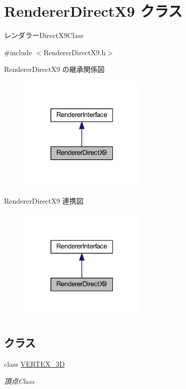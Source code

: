 \hypertarget{class_renderer_direct_x9}{}\section{Renderer\+Direct\+X9 クラス}
\label{class_renderer_direct_x9}


レンダラー\+Direct\+X9\+Class  




{\ttfamily \#include $<$Renderer\+Direct\+X9.\+h$>$}



Renderer\+Direct\+X9 の継承関係図
\nopagebreak
\begin{figure}[H]
\begin{center}
\leavevmode
\includegraphics[width=172pt]{class_renderer_direct_x9__inherit__graph}
\end{center}
\end{figure}


Renderer\+Direct\+X9 連携図
\nopagebreak
\begin{figure}[H]
\begin{center}
\leavevmode
\includegraphics[width=172pt]{class_renderer_direct_x9__coll__graph}
\end{center}
\end{figure}
\subsection*{クラス}
\begin{DoxyCompactItemize}
\item 
class \mbox{\hyperlink{class_renderer_direct_x9_1_1_v_e_r_t_e_x__3_d}{V\+E\+R\+T\+E\+X\+\_\+3D}}
\begin{DoxyCompactList}\small\item\em 頂点\+Class \end{DoxyCompactList}\end{DoxyCompactItemize}
